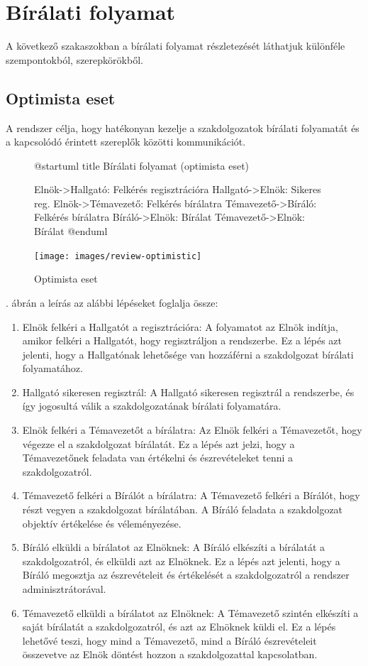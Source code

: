\documentclass[a4paper,12pt]{article}
\begin{document}
\section{Bírálati folyamat}

A következő szakaszokban a bírálati folyamat részletezését láthatjuk különféle szempontokból, szerepkörökből.

\subsection{Optimista eset}

A rendszer célja, hogy hatékonyan kezelje a szakdolgozatok bírálati folyamatát és a kapcsolódó érintett szereplők közötti kommunikációt. 

\begin{figure}
\centering
\begin{plantuml}
@startuml
title Bírálati folyamat (optimista eset)

Elnök->Hallgató: Felkérés regisztrációra
Hallgató->Elnök: Sikeres reg.
Elnök->Témavezető: Felkérés bírálatra
Témavezető->Bíráló: Felkérés bírálatra
Bíráló->Elnök: Bírálat
Témavezető->Elnök: Bírálat
@enduml
\end{plantuml}
\texttt{[image: images/review-optimistic]}
\caption{Optimista eset}
\label{fig:review-optimistic}
\end{figure}

. ábrán a leírás az alábbi lépéseket foglalja össze:
\begin{enumerate}
\item Elnök felkéri a Hallgatót a regisztrációra: A folyamatot az Elnök indítja, amikor felkéri a Hallgatót, hogy regisztráljon a rendszerbe. Ez a lépés azt jelenti, hogy a Hallgatónak lehetősége van hozzáférni a szakdolgozat bírálati folyamatához.
\item Hallgató sikeresen regisztrál: A Hallgató sikeresen regisztrál a rendszerbe, és így jogosultá válik a szakdolgozatának bírálati folyamatára.
\item Elnök felkéri a Témavezetőt a bírálatra: Az Elnök felkéri a Témavezetőt, hogy végezze el a szakdolgozat bírálatát. Ez a lépés azt jelzi, hogy a Témavezetőnek feladata van értékelni és észrevételeket tenni a szakdolgozatról.
\item Témavezető felkéri a Bírálót a bírálatra: A Témavezető felkéri a Bírálót, hogy részt vegyen a szakdolgozat bírálatában. A Bíráló feladata a szakdolgozat objektív értékelése és véleményezése.
\item Bíráló elküldi a bírálatot az Elnöknek: A Bíráló elkészíti a bírálatát a szakdolgozatról, és elküldi azt az Elnöknek. Ez a lépés azt jelenti, hogy a Bíráló megosztja az észrevételeit és értékelését a szakdolgozatról a rendszer adminisztrátorával.
\item Témavezető elküldi a bírálatot az Elnöknek: A Témavezető szintén elkészíti a saját bírálatát a szakdolgozatról, és azt az Elnöknek küldi el. Ez a lépés lehetővé teszi, hogy mind a Témavezető, mind a Bíráló észrevételeit összevetve az Elnök döntést hozzon a szakdolgozattal kapcsolatban.
\end{enumerate}
\end{document}
